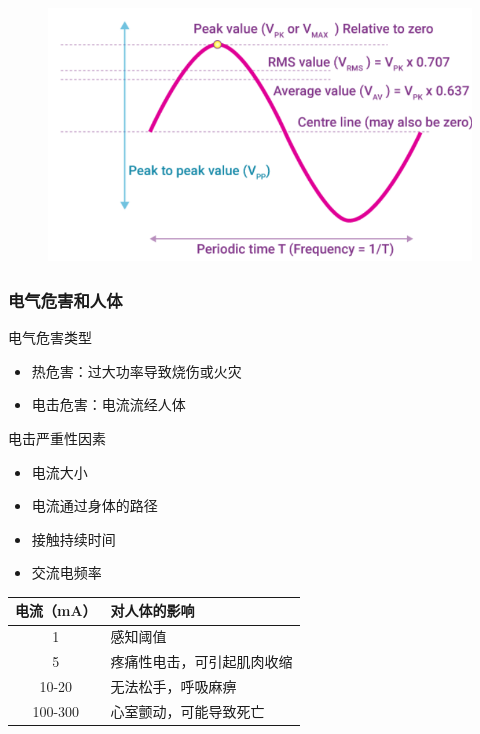 \documentclass{beamer}
\begin{document}
\begin{frame}
    \begin{figure}
        \centering
        \includegraphics[width=0.75\linewidth]{phys12-circuits-rms-voltage-ac.png}
    \end{figure}
\end{frame}

\begin{frame}
    \frametitle{电气危害和人体}
    \begin{block}{电气危害类型}
        \begin{itemize}
            \item 热危害：过大功率导致烧伤或火灾
            \item 电击危害：电流流经人体
        \end{itemize}
    \end{block}
    \begin{block}{电击严重性因素}
        \begin{itemize}
            \item 电流大小
            \item 电流通过身体的路径
            \item 接触持续时间
            \item 交流电频率
        \end{itemize}
    \end{block}
    \begin{center}
        \begin{tabular}{|c|l|}
            \hline
            \textbf{电流（mA）} & \textbf{对人体的影响} \\
            \hline
            1 & 感知阈值 \\
            5 & 疼痛性电击，可引起肌肉收缩 \\
            10-20 & 无法松手，呼吸麻痹 \\
            100-300 & 心室颤动，可能导致死亡 \\
            \hline
        \end{tabular}
    \end{center}
\end{frame}
\end{document}
